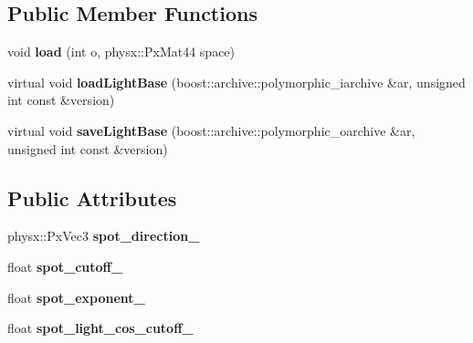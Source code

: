 \subsection*{\-Public \-Member \-Functions}
\begin{DoxyCompactItemize}
\item 
\hypertarget{classNeb_1_1Light_1_1Spot_aac1158af06dd297e5ea74a2abcd8a450}{void {\bfseries load} (int o, physx\-::\-Px\-Mat44 space)}\label{classNeb_1_1Light_1_1Spot_aac1158af06dd297e5ea74a2abcd8a450}

\item 
\hypertarget{classNeb_1_1Light_1_1Spot_af9b351cb8e7216e6fec3bcda3b0fc555}{virtual void {\bfseries load\-Light\-Base} (boost\-::archive\-::polymorphic\-\_\-iarchive \&ar, unsigned int const \&version)}\label{classNeb_1_1Light_1_1Spot_af9b351cb8e7216e6fec3bcda3b0fc555}

\item 
\hypertarget{classNeb_1_1Light_1_1Spot_a0b84b8454478e83bf35974c057a7ba34}{virtual void {\bfseries save\-Light\-Base} (boost\-::archive\-::polymorphic\-\_\-oarchive \&ar, unsigned int const \&version)}\label{classNeb_1_1Light_1_1Spot_a0b84b8454478e83bf35974c057a7ba34}

\end{DoxyCompactItemize}
\subsection*{\-Public \-Attributes}
\begin{DoxyCompactItemize}
\item 
\hypertarget{classNeb_1_1Light_1_1Spot_a7ec5b15e3811a108228fccbd9c607523}{physx\-::\-Px\-Vec3 {\bfseries spot\-\_\-direction\-\_\-}}\label{classNeb_1_1Light_1_1Spot_a7ec5b15e3811a108228fccbd9c607523}

\item 
\hypertarget{classNeb_1_1Light_1_1Spot_a72b93fdb19cb465f855978d10984a659}{float {\bfseries spot\-\_\-cutoff\-\_\-}}\label{classNeb_1_1Light_1_1Spot_a72b93fdb19cb465f855978d10984a659}

\item 
\hypertarget{classNeb_1_1Light_1_1Spot_ac879c3a4975b5522b17984bb1c60a04b}{float {\bfseries spot\-\_\-exponent\-\_\-}}\label{classNeb_1_1Light_1_1Spot_ac879c3a4975b5522b17984bb1c60a04b}

\item 
\hypertarget{classNeb_1_1Light_1_1Spot_aa95ba64ea7c38418312711a335202f5a}{float {\bfseries spot\-\_\-light\-\_\-cos\-\_\-cutoff\-\_\-}}\label{classNeb_1_1Light_1_1Spot_aa95ba64ea7c38418312711a335202f5a}

\end{DoxyCompactItemize}
